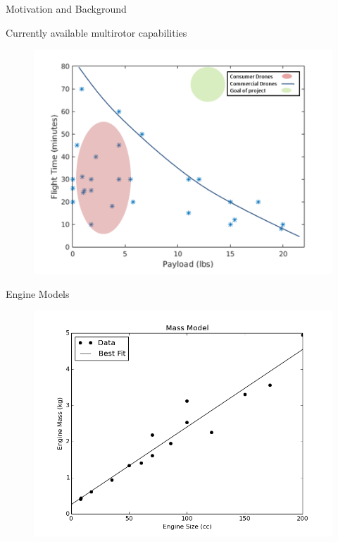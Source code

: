 \documentclass{beamer}
\begin{document}
\begin{frame}{Motivation and Background}
	\begin{center}
	Currently available multirotor capabilities
	\end{center}
	\begin{figure}
		\begin{center}
			\includegraphics[width=.70\textwidth]{../current_capabilities.png}
			\label{current_capabilities}
		\end{center}
	\end{figure}
\end{frame}

\begin{frame}{Engine Models}

	\begin{figure}
		\begin{center}
			\includegraphics[width=.70\textwidth]{../mass.png}
			\label{fig:eng_mass}
		\end{center}
	\end{figure}
\end{frame}
\end{document}
